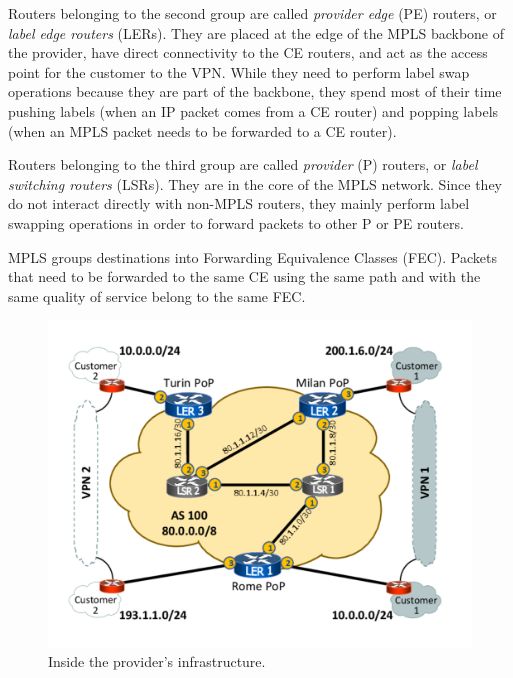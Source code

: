 \documentclass{article}
\begin{document}
Routers belonging to the second group are called \emph{provider edge} (PE) 
routers, or \emph{label edge routers} (LERs). They are placed at the edge of the 
MPLS backbone of the provider, have direct connectivity to the CE routers, and 
act as the access point for the customer to the VPN. While they need to perform label swap operations because they are part 
of the backbone, they spend most of their time pushing labels (when an IP packet 
comes from a CE router) and popping labels (when an MPLS packet needs to be 
forwarded to a CE router).

Routers belonging to the third group are called \emph{provider} (P) routers, or 
\emph{label switching routers} (LSRs). They are in the core of the MPLS network. 
Since they do not interact directly with non-MPLS routers, they mainly perform 
label swapping operations in order to forward packets to other P or PE routers.

MPLS groups destinations into Forwarding Equivalence Classes (FEC). 
Packets that need to be forwarded to the same CE using the same path and with 
the same quality of service belong to the same FEC.


\begin{figure}
\centering
 \includegraphics[trim=0cm 1.5cm 0cm 1.5cm, clip=true, width=0.7\columnwidth]{figures/mpls-slides-1}
 \caption{Inside the provider's infrastructure.}
 \label{fig:mpls-slides-1}
\end{figure}

% 
% 
\end{document}
